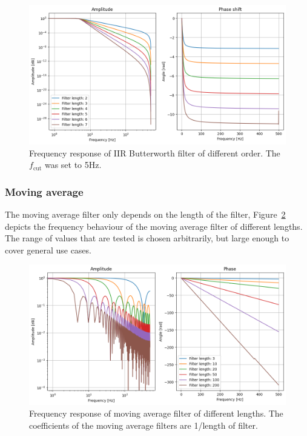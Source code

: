 \begin{figure}[h!t]
	\begin{center}
		\includegraphics[width=1.0\columnwidth]{images/iir_frequencyresponse_coefficients.png}
	\end{center}
	\caption{Frequency response of IIR Butterworth filter of different order. The $f_\text{cut}$ was set to 5Hz.}
	\label{fig:iir_frequencyresponse_coefficients}
\end{figure}

\subsubsection{Moving average}
The moving average filter only depends on the length of the filter, Figure~\ref{fig:movingaverage_frequencyresponse_coefficients} depicts the frequency behaviour of the moving average filter of different lengths. The range of values that are tested is chosen arbitrarily, but large enough to cover general use cases.

\begin{figure}[h!t]
	\begin{center}
		\includegraphics[width=1.0\columnwidth]{images/movingaverage_frequencyresponse_coefficients.png}
	\end{center}
	\caption{Frequency response of moving average filter of different lengths. The coefficients of the moving average filters are 1/length of filter.}
	\label{fig:movingaverage_frequencyresponse_coefficients}
\end{figure}

